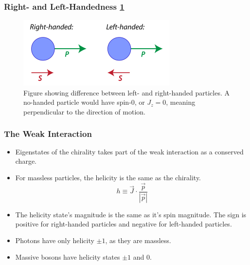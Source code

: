 \subsubsection{Right- and Left-Handedness \cref{fig: left_vs_right_handedness}}
\begin{figure}[h!]
\centering
\includegraphics[width = \textwidth]{left_vs_right_handedness.png}
\caption{Figure showing difference between left- and right-handed particles. A no-handed particle would have spin-0, or $J_z = 0$, meaning perpendicular to the direction of motion.}
\label{fig: left_vs_right_handedness}
\end{figure}

\subsubsection{The Weak Interaction}  
\begin{itemize}
  \item Eigenstates of the chirality takes part of the weak interaction as a conserved charge. 
  \item For massless particles, the helicity is the same as the chirality.
  \begin{equation}
    h ≡ \vec{J} ⋅  \frac{\vec{p}}{\left|\vec{p}\right|}
  \end{equation} 
  \item The helicity state's magnitude is the same as it's spin magnitude. The sign is positive for right-handed particles and negative for left-handed particles.
  \item Photons have only helicity $±1$, as they are massless.
  \item Massive bosons have helicity states $±1$ and $0$.
\end{itemize}


